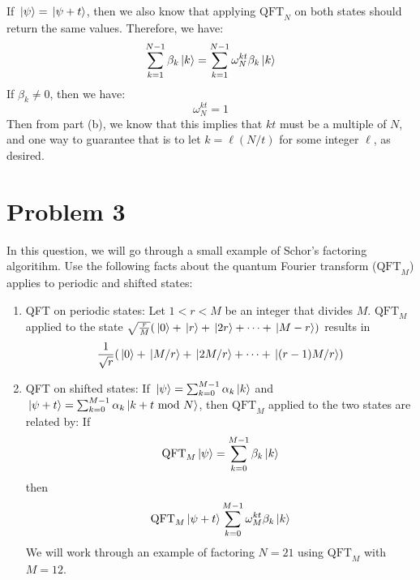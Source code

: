 \documentclass[10pt]{article}
\begin{document}
\begin{enumerate}[label=\alph*)]
			\begin{solution}
				If \( \ket*{\psi} = \ket*{\psi + t}\), then we also know that applying \( \text{QFT}_N \) on both 
				states should return the same values. Therefore, we have:
				\[
				\sum_{k=1}^{N-1} \beta_k \ket*{k} = \sum_{k=1}^{N-1} \omega_N^{kt}\beta_k \ket*{k}
				\] 
				If \( \beta_k \neq 0 \), then we have:
				\[
				\omega_N ^{kt} = 1
				\] 
				Then from part (b), we know that this implies that \( kt \) must be a multiple of \( N \), and one 
				way to guarantee that is to let \( k = \ell(N / t) \) for some integer  \( \ell \), as desired. 
			\end{solution}
	\end{enumerate}
	\pagebreak
	\section*{Problem 3}
	In this question, we will go through a small example of Schor's factoring algoritihm. Use the following facts about 
	the quantum Fourier transform (\( \text{QFT}_M \)) applies to periodic and shifted states:
	\begin{enumerate}[label=\arabic*)]
		\item QFT on periodic states: Let \( 1 < r < M \) be an integer that divides \( M \). \( \text{QFT}_M \) 
			applied to the state \( \sqrt{\frac{r}{M}} (\ket*{0} + \ket*{r} + \ket*{2r} + \cdots + \ket*{M - r})\)
			results in 
			\[
			\frac{1}{\sqrt{r} }(\ket*{0 } + \ket*{M / r} + \ket*{2 M / r} + \cdots + \ket*{(r - 1) M /r})
			\] 
		\item QFT on shifted states: If \( \ket*{\psi} = \sum_{k=0}^{M-1} \alpha_k \ket*{k} \) and 
			\( \ket*{\psi + t} = \sum_{k=0}^{M-1} \alpha_k \ket*{k + t \ \text{mod } N} \), then \( \text{QFT}_M \) 
			applied to the two states are related by: If 
			\[
			\text{QFT}_M \ket*{\psi} = \sum_{k=0}^{M-1} \beta_k \ket*{k}
			\] 
			then 
			\[
			\text{QFT}_M \ket*{\psi + t} \sum_{k=0}^{M-1} \omega_M^{kt}\beta_k \ket*{k}
			\] 
			We will work through an example of factoring \( N = 21 \) using \( \text{QFT}_M \) with \( M = 12 \). 
	\end{enumerate}
\end{document}
